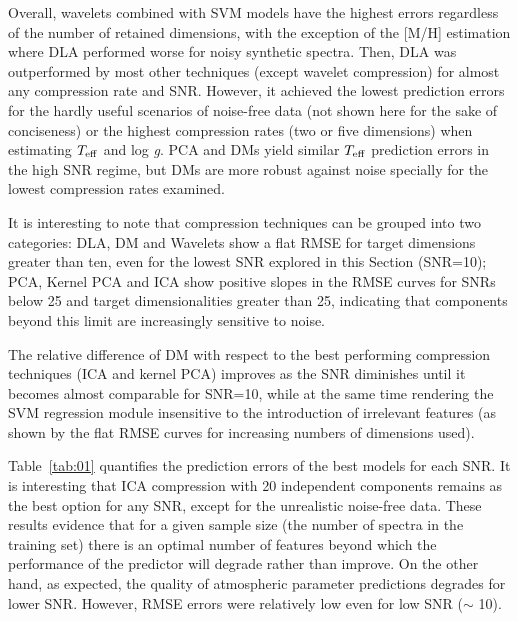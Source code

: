 \documentclass[a4paper,fleqn,usenatbib]{mnras}
\begin{document}
{{{Overall, wavelets combined with SVM models have the highest errors
regardless of the number of retained dimensions, with the exception of
the [M/H] estimation where DLA performed worse for noisy synthetic
spectra. Then, DLA was outperformed by most other techniques (except wavelet 
compression) for almost any compression rate and SNR. However, 
it achieved the lowest prediction errors for the hardly useful scenarios of noise-free data 
(not shown here for the sake of conciseness) or the highest compression 
rates (two or five dimensions) when estimating $T_{\rm eff}$ and 
log \textit{g}. PCA and DMs yield similar $T_{\rm eff}$ prediction
errors in the high SNR regime, but DMs are more robust against noise
specially for the lowest compression rates examined.

It is interesting to note that compression techniques can be grouped
into two categories: DLA, DM and Wavelets show a flat RMSE for target
dimensions greater than ten, even for the lowest SNR explored in this
Section (SNR=10); PCA, Kernel PCA and ICA show positive slopes in the
RMSE curves for SNRs below 25 and target dimensionalities greater than
25, indicating that components beyond this limit are increasingly
sensitive to noise. 

The relative difference of DM with respect to the best
performing compression techniques (ICA and kernel PCA) improves as the
SNR diminishes until it becomes almost comparable for SNR=10, while at
the same time rendering the SVM regression module insensitive to the
introduction of irrelevant features (as shown by the flat RMSE curves
for increasing numbers of dimensions used). 

Table~\ref{tab:01} quantifies the prediction errors of the best models
for each SNR. It is interesting that ICA compression with 20
independent components remains as the best option for any SNR, except
for the unrealistic noise-free data. 
These results evidence that for a given sample
size (the number of spectra in the training set) there is
an optimal number of features beyond which the performance of the
predictor will degrade rather than improve. On the other hand, as
expected, the quality of atmospheric parameter predictions degrades 
for lower SNR. However, RMSE errors were relatively low even for 
low SNR ($\sim$ 10).  

}}}
\end{document}
